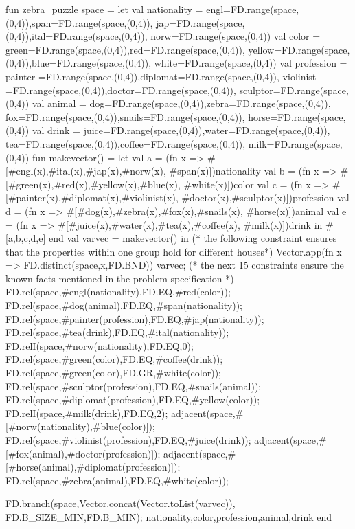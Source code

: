 \documentclass[a4paper]{scrartcl}
\begin{document}
\begin{myverbatim}
   
fun zebra_puzzle space =
  let
     val nationality  = 
       {engl=FD.range(space,(0,4)),span=FD.range(space,(0,4)),
        jap=FD.range(space,(0,4)),ital=FD.range(space,(0,4)),
        norw=FD.range(space,(0,4))}
     val color  =
       {green=FD.range(space,(0,4)),red=FD.range(space,(0,4)),
        yellow=FD.range(space,(0,4)),blue=FD.range(space,(0,4)),
        white=FD.range(space,(0,4))}
     val profession = 
       {painter =FD.range(space,(0,4)),diplomat=FD.range(space,(0,4)),
        violinist =FD.range(space,(0,4)),doctor=FD.range(space,(0,4)),
        sculptor=FD.range(space,(0,4))}
     val animal =
       {dog=FD.range(space,(0,4)),zebra=FD.range(space,(0,4)),
        fox=FD.range(space,(0,4)),snails=FD.range(space,(0,4)),
        horse=FD.range(space,(0,4))}
     val drink  = 
       {juice=FD.range(space,(0,4)),water=FD.range(space,(0,4)),
        tea=FD.range(space,(0,4)),coffee=FD.range(space,(0,4)),
        milk=FD.range(space,(0,4))}
     fun makevector() = 
        let val a = (fn x => #[#engl(x),#ital(x),#jap(x),#norw(x),
                        #span(x)])nationality
            val b = (fn x => #[#green(x),#red(x),#yellow(x),#blue(x),
                        #white(x)])color
            val c = (fn x => #[#painter(x),#diplomat(x),#violinist(x),
                        #doctor(x),#sculptor(x)])profession
            val d = (fn x => #[#dog(x),#zebra(x),#fox(x),#snails(x),
                        #horse(x)])animal
            val e = (fn x => #[#juice(x),#water(x),#tea(x),#coffee(x),
                        #milk(x)])drink
        in
            #[a,b,c,d,e]
        end
     val varvec = makevector()
  in
        (* the following constraint ensures that the properties
           within one group hold for different houses*) 
        Vector.app(fn x => FD.distinct(space,x,FD.BND))
                      varvec;          
        (* the next 15 constraints ensure the known
           facts mentioned in the problem specification *)
        FD.rel(space,#engl(nationality),FD.EQ,#red(color));
        FD.rel(space,#dog(animal),FD.EQ,#span(nationality));
        FD.rel(space,#painter(profession),FD.EQ,#jap(nationality));
        FD.rel(space,#tea(drink),FD.EQ,#ital(nationality));
        FD.relI(space,#norw(nationality),FD.EQ,0);
        FD.rel(space,#green(color),FD.EQ,#coffee(drink));
        FD.rel(space,#green(color),FD.GR,#white(color));
        FD.rel(space,#sculptor(profession),FD.EQ,#snails(animal));
        FD.rel(space,#diplomat(profession),FD.EQ,#yellow(color));
        FD.relI(space,#milk(drink),FD.EQ,2);
        adjacent(space,#[#norw(nationality),#blue(color)]);
        FD.rel(space,#violinist(profession),FD.EQ,#juice(drink));
        adjacent(space,#[#fox(animal),#doctor(profession)]);
        adjacent(space,#[#horse(animal),#diplomat(profession)]);
        FD.rel(space,#zebra(animal),FD.EQ,#white(color));
        
        FD.branch(space,Vector.concat(Vector.toList(varvec)),
                   FD.B_SIZE_MIN,FD.B_MIN);
        {nationality,color,profession,animal,drink}
 end
\end{myverbatim}
\end{document}

